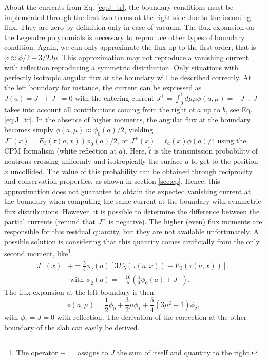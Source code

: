 \documentclass{ictt26}
\newcommand{\pluseq}{\mathrel{+}=}
\begin{document}
About the currents from Eq. \ref{eq:J_tr}, the boundary conditions must be implemented through the first two terms at the right side due to the incoming flux. They are zero by definition only in case of vacuum. The flux expansion on the Legendre polynomials is necessary to reproduce other types of boundary condition. Again, we can only approximate the flux up to the first order, that is $\varphi \approx \phi/2 + 3/2 J \mu$. This approximation may not reproduce a vanishing current with reflection reproducing a symmetric distribution. Only situations with perfectly isotropic angular flux at the boundary will be described correctly. At the left boundary for instance, the current can be expressed as $J(a) =  J^+ + J^- = 0$ with the entering current $J^+ = \int_0^1 { d\mu \mu \phi(a, \mu) } = - J^-$. $J^-$ takes into account all contributions coming from the right of $a$ up to $b$, see Eq. \ref{eq:J_tr}. In the absence of higher moments, the angular flux at the boundary becomes simply $\phi(a, \mu) \approx \phi_0(a) / 2$, yielding $J^+(x) = E_3 \left(\tau(a, x)\right)\phi_0(a)/2$, or $J^+(x) = \tilde{t}_a(x) \phi(a)/4$ using the CPM formalism (white reflection at $a$). Here, $\tilde{t}$ is the transmission probability of neutrons crossing uniformly and isotropically the surface $a$ to get to the position $x$ uncollided. The value of this probability can be obtained through reciprocity and conservation properties, as shown in section \ref{sec:cp}. Hence, this approximation does not guarantee to obtain the expected vanishing current at the boundary when computing the same current at the boundary with symmetric flux distributions. However, it is possible to determine the difference between the partial currents (remind that $J^-$ is negative). The higher (even) flux moments are responsible for this residual quantity, but they are not available unfortunately. A possible solution is considering that this quantity comes artificially from the only second moment, like\footnote{The operator $\pluseq$ assigns to $J$ the sum of itself and quantity to the right.}
\begin{equation}
\begin{split}
J^+(x) &\pluseq \frac{5}{4} \tilde{\phi}_2(a) \left[ 3 E_5(\tau(a, x)) - E_3(\tau(a, x)) \right],\\ &\text{ with } \tilde{\phi}_2(a) = - \frac{16}{5} \left( \frac{1}{4} \phi_0(a) + J^- \right).
\end{split}
\end{equation}
The flux expansion at the left boundary is then
\[ \phi(a, \mu) = \frac{1}{2} \phi_0 + \frac{3}{2} \mu \phi_1 + \frac{5}{4} \left( 3 \mu^2 - 1 \right) \tilde{\phi}_2, \]
with $\phi_1 = J = 0$ with reflection. The derivation of the correction at the other boundary of the slab can easily be derived.
\end{document}
